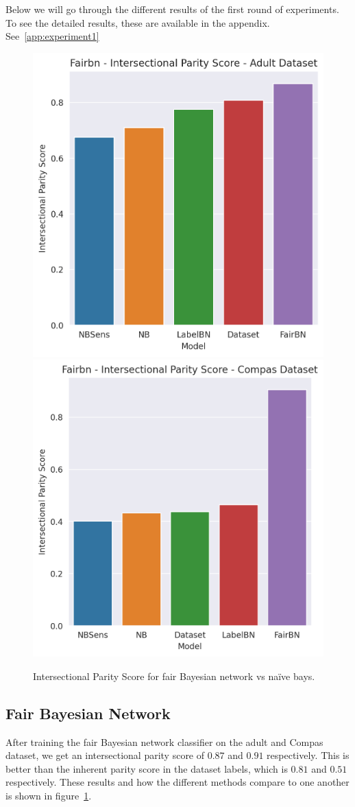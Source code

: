 \label{sec:result:experiment1}

Below we will go through the different results of the first round of experiments. To see the detailed results, these are available in the appendix. See~\ref{app:experiment1}

\begin{figure}
    \centering
    \includegraphics[width=0.49\linewidth]{figures/adult_fairbn_parity.png}
    \includegraphics[width=0.49\linewidth]{figures/compas_fairbn_parity.png}
    \caption{Intersectional Parity Score for fair Bayesian network vs naïve bays.}
    \label{fig:exp1fairBNparity}
\end{figure}

\subsection{Fair Bayesian Network}

After training the fair Bayesian network classifier on the adult and Compas dataset, we get an intersectional parity score of $0.87$ and $0.91$ respectively. This is better than the inherent parity score in the dataset labels, which is $0.81$ and $0.51$ respectively. These results and how the different methods compare to one another is shown in figure~\ref{fig:exp1fairBNparity}.

